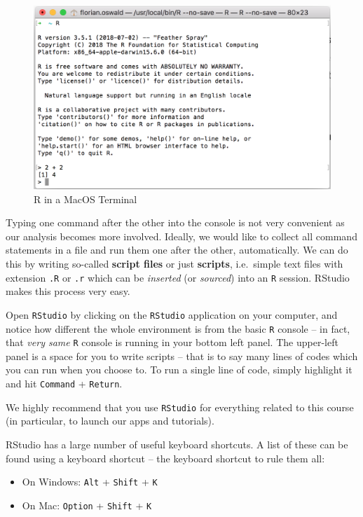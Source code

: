 \documentclass[]{book}
\providecommand{\tightlist}{%
  \setlength{\itemsep}{0pt}\setlength{\parskip}{0pt}}
\newenvironment{note}{\begin{tcolorbox}[colback=blue!5!white,colframe=blue!75!black]}{\end{tcolorbox}}
\begin{document}
\begin{figure}

{\centering \includegraphics[width=0.5\linewidth]{images/console} 

}

\caption{R in a MacOS Terminal}\label{fig:console2}
\end{figure}

Typing one command after the other into the console is not very convenient as our analysis becomes more involved. Ideally, we would like to collect all command statements in a file and run them one after the other, automatically. We can do this by writing so-called \textbf{script files} or just \textbf{scripts}, i.e.~simple text files with extension \texttt{.R} or \texttt{.r} which can be \emph{inserted} (or \emph{sourced}) into an \texttt{R} session. RStudio makes this process very easy.

Open \texttt{RStudio} by clicking on the \texttt{RStudio} application on your computer, and notice how different the whole environment is from the basic \texttt{R} console -- in fact, that \emph{very same} \texttt{R} console is running in your bottom left panel. The upper-left panel is a space for you to write scripts -- that is to say many lines of codes which you can run when you choose to. To run a single line of code, simply highlight it and hit \texttt{Command} + \texttt{Return}.

\begin{note}
We highly recommend that you use \texttt{RStudio} for everything related
to this course (in particular, to launch our apps and tutorials).
\end{note}

RStudio has a large number of useful keyboard shortcuts. A list of these can be found using a keyboard shortcut -- the keyboard shortcut to rule them all:

\begin{itemize}
\tightlist
\item
  On Windows: \texttt{Alt} + \texttt{Shift} + \texttt{K}
\item
  On Mac: \texttt{Option} + \texttt{Shift} + \texttt{K}
\end{itemize}
\end{document}
